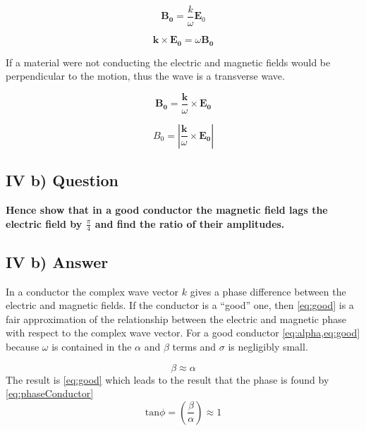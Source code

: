 \documentclass[12pt]{article}
\begin{document}
\begin{equation}
\label{eq:re1}
\mathbf{B_{0}}=\frac{k}{\omega} \mathbf{E}_{0}
\end{equation}

\begin{equation}
\label{eq:re2}
\mathbf{k}\times\mathbf{E_{0}}=\omega \mathbf{B_{0}}
\end{equation}

\noindent
If a material were not conducting the electric and magnetic fields would be perpendicular to the motion, thus the wave is a transverse wave. 

\begin{equation}
\label{eq:re3}
\mathbf{B_{0}}=\frac{\mathbf{k}}{\omega } \times\mathbf{E_{0}}
\end{equation}


\begin{equation}
\label{eq:re4}
B_{0}=\left|\frac{\mathbf{k}}{\omega } \times\mathbf{E_{0}}\right |
\end{equation}


\subsection*{IV b) Question}
\textbf{Hence show that in a good conductor the magnetic field lags the electric field by $\frac{\pi}{4}$ and find the ratio of their amplitudes.}
\subsection*{IV b) Answer}
\noindent
In a conductor the complex wave vector $k$ gives a phase difference between the electric and magnetic fields. If the conductor is a \enquote{good} one, then \cref{eq:good} is a fair approximation of the relationship between the electric and magnetic phase with respect to the complex wave vector. 
\noindent
For a good conductor \cref{eq:alpha,eq:good} because $\omega$ is contained in the $\alpha$ and $\beta$ terms and $\sigma$ is negligibly small.


\begin{equation}
\label{eq:good}
\beta\approx \alpha
\end{equation}
\noindent
The result is \cref{eq:good} which leads to the result that the phase is found by \cref{eq:phaseConductor}
\begin{equation}
\label{eq:phaseConductor}
\mathrm{tan}\phi=\left(\frac{\beta}{\alpha}\right)\approx 1
\end{equation}
\end{document}
